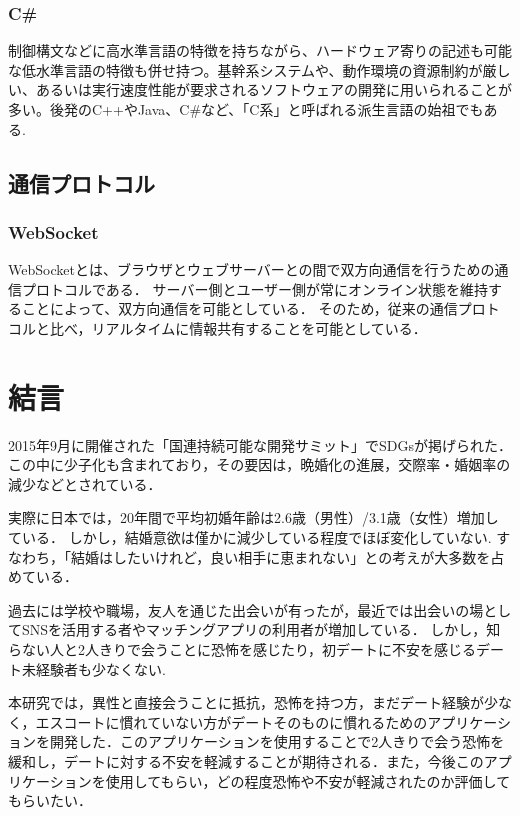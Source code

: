 \documentclass[12pt,a4j,titlepage]{ltjsarticle}
\begin{document}
\subsubsection{C\#}
制御構文などに高水準言語の特徴を持ちながら、ハードウェア寄りの記述も可能な低水準言語の特徴も併せ持つ。基幹系システムや、動作環境の資源制約が厳しい、あるいは実行速度性能が要求されるソフトウェアの開発に用いられることが多い。後発のC++やJava、C\#など、「C系」と呼ばれる派生言語の始祖でもある.

\subsection{通信プロトコル}
\subsubsection{WebSocket}
WebSocketとは、ブラウザとウェブサーバーとの間で双方向通信を行うための通信プロトコルである．
サーバー側とユーザー側が常にオンライン状態を維持することによって、双方向通信を可能としている．
そのため，従来の通信プロトコルと比べ，リアルタイムに情報共有することを可能としている\cite{wecsocketsetumi}．
\clearpage

\section{結言}
2015年9月に開催された「国連持続可能な開発サミット」でSDGsが掲げられた．この中に少子化も含まれており，その要因は，晩婚化の進展\cite{sasaki2012}，交際率・婚姻率の減少\cite{naikakufu2019}などとされている．

実際に日本では，20年間で平均初婚年齢は2.6歳（男性）/3.1歳（女性）増加している．
しかし，結婚意欲は僅かに減少している程度でほぼ変化していない.
すなわち，「結婚はしたいけれど，良い相手に恵まれない」との考えが大多数を占めている\cite{naikakufu2019}．

過去には学校や職場，友人を通じた出会いが有ったが，最近では出会いの場としてSNSを活用する者やマッチングアプリの利用者が増加している．
しかし，知らない人と2人きりで会うことに恐怖を感じたり，初デートに不安を感じるデート未経験者も少なくない\cite{prtimes,yoshimura2020}.

本研究では，異性と直接会うことに抵抗，恐怖を持つ方，まだデート経験が少なく，エスコートに慣れていない方がデートそのものに慣れるためのアプリケーションを開発した．このアプリケーションを使用することで2人きりで会う恐怖を緩和し，デートに対する不安を軽減することが期待される．また，今後このアプリケーションを使用してもらい，どの程度恐怖や不安が軽減されたのか評価してもらいたい．
\end{document}
